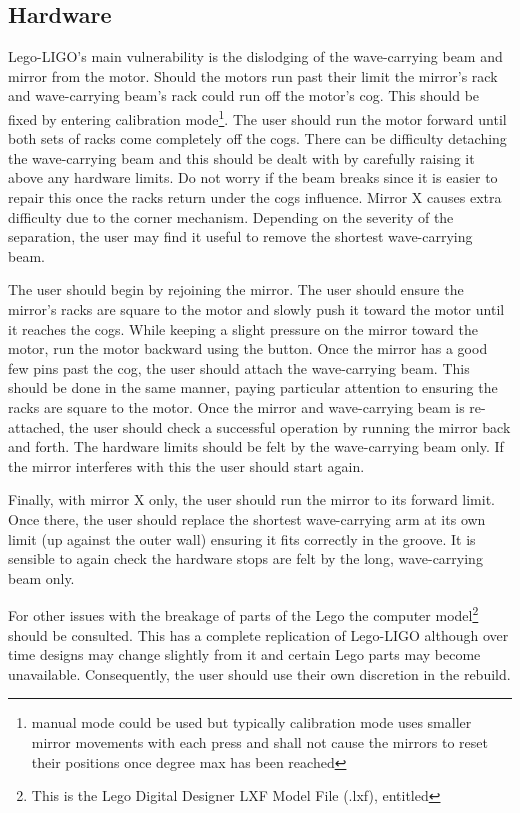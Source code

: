 \documentclass[a4paper, 12pt]{book}
\begin{document}
\subsection{Hardware}
Lego-LIGO's main vulnerability is the dislodging of the wave-carrying beam and mirror from the motor. Should the motors run past their limit the mirror's rack and wave-carrying beam's rack could run off the motor's cog. This should be fixed by entering calibration mode\footnote{manual mode could be used but typically calibration mode uses smaller mirror movements with each press and shall not cause the mirrors to reset their positions once degree max has been reached}. The user should run the motor forward until both sets of racks come completely off the cogs. There can be difficulty detaching the wave-carrying beam and this should be dealt with by carefully raising it above any hardware limits. Do not worry if the beam breaks since it is easier to repair this once the racks return under the cogs influence. Mirror X causes extra difficulty due to the corner mechanism. Depending on the severity of the separation, the user may find it useful to remove the shortest wave-carrying beam.

The user should begin by rejoining the mirror. The user should ensure the mirror's racks are square to the motor and slowly push it toward the motor until it reaches the cogs. While keeping a slight pressure on the mirror toward the motor, run the motor backward using the  button. Once the mirror has a good few pins past the cog, the user should attach the wave-carrying beam. This should be done in the same manner, paying particular attention to ensuring the racks are square to the motor. Once the mirror and wave-carrying beam is re-attached, the user should check a successful operation by running the mirror back and forth. The hardware limits should be felt by the wave-carrying beam only. If the mirror interferes with this the user should start again.

Finally, with mirror X only, the user should run the mirror to its forward limit. Once there, the user should replace the shortest wave-carrying arm at its own limit (up against the outer wall) ensuring it fits correctly in the groove. It is sensible to again check the hardware stops are felt by the long, wave-carrying beam only.

For other issues with the breakage of parts of the Lego the computer model\footnote{This is the Lego Digital Designer LXF Model File (.lxf), entitled } should be consulted. This has a complete replication of Lego-LIGO although over time designs may change slightly from it and certain Lego parts may become unavailable. Consequently, the user should use their own discretion in the rebuild.
\end{document}
